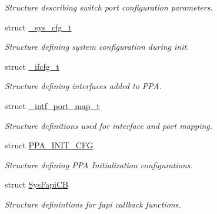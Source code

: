 \begin{DoxyCompactItemize}
\begin{DoxyCompactList}\small\item\em Structure describing switch port configuration parameters. \end{DoxyCompactList}\item 
struct \hyperlink{struct__sys__cfg__t}{\-\_\-sys\-\_\-cfg\-\_\-t}
\begin{DoxyCompactList}\small\item\em Structure defining system configuration during init. \end{DoxyCompactList}\item 
struct \hyperlink{struct__ifcfg__t}{\-\_\-ifcfg\-\_\-t}
\begin{DoxyCompactList}\small\item\em Structure defining interfaces added to P\-P\-A. \end{DoxyCompactList}\item 
struct \hyperlink{struct__intf__port__map__t}{\-\_\-intf\-\_\-port\-\_\-map\-\_\-t}
\begin{DoxyCompactList}\small\item\em Structure definitions used for interface and port mapping. \end{DoxyCompactList}\item 
struct \hyperlink{structPPA__INIT__CFG}{P\-P\-A\-\_\-\-I\-N\-I\-T\-\_\-\-C\-F\-G}
\begin{DoxyCompactList}\small\item\em Structure defining P\-P\-A Initialization configurations. \end{DoxyCompactList}\item 
struct \hyperlink{structSysFapiCB}{Sys\-Fapi\-C\-B}
\begin{DoxyCompactList}\small\item\em Structure definintions for fapi callback functions. \end{DoxyCompactList}\end{DoxyCompactItemize}
